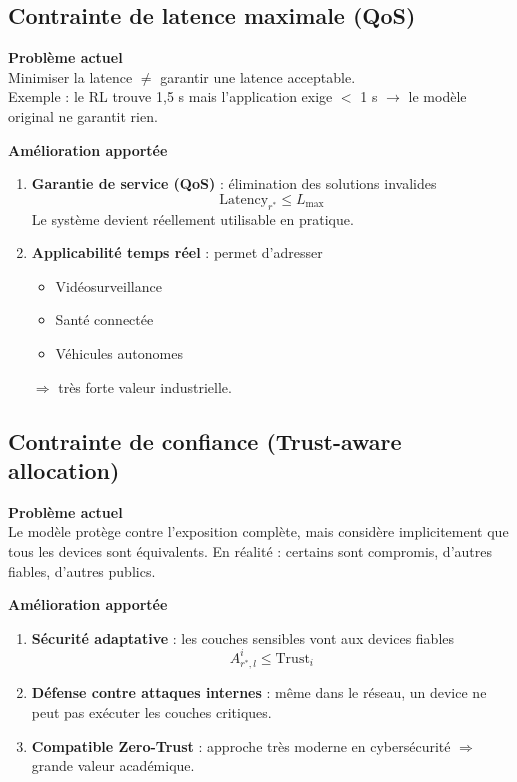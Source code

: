 \documentclass[a4paper,11pt]{article}
\begin{document}
\subsection{Contrainte de latence maximale (QoS)}
\textbf{Problème actuel}\\
Minimiser la latence $\neq$ garantir une latence acceptable.\\
Exemple : le RL trouve 1,5 s mais l’application exige $<$ 1 s $\rightarrow$ le modèle original ne garantit rien.

\textbf{Amélioration apportée}
\begin{enumerate}[label=\alph*)]
\item \textbf{Garantie de service (QoS)} : élimination des solutions invalides
\[
\text{Latency}_{r^*} \le L_{\max}
\]
Le système devient réellement utilisable en pratique.
\item \textbf{Applicabilité temps réel} : permet d’adresser
\begin{itemize}[leftmargin=*]
\item Vidéosurveillance
\item Santé connectée
\item Véhicules autonomes
\end{itemize}
$\Rightarrow$ très forte valeur industrielle.
\end{enumerate}

\subsection{Contrainte de confiance (Trust-aware allocation)}
\textbf{Problème actuel}\\
Le modèle protège contre l’exposition complète, mais considère implicitement que tous les devices sont équivalents. En réalité : certains sont compromis, d’autres fiables, d’autres publics.

\textbf{Amélioration apportée}
\begin{enumerate}[label=\alph*)]
\item \textbf{Sécurité adaptative} : les couches sensibles vont aux devices fiables
\[
A^i_{r^*,l} \le \text{Trust}_i
\]
\item \textbf{Défense contre attaques internes} : même dans le réseau, un device ne peut pas exécuter les couches critiques.
\item \textbf{Compatible Zero-Trust} : approche très moderne en cybersécurité $\Rightarrow$ grande valeur académique.
\end{enumerate}
\end{document}
